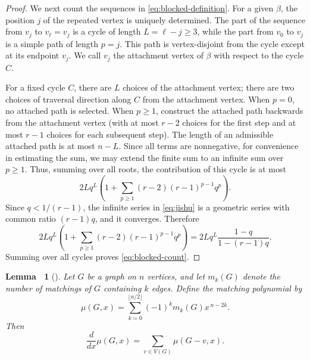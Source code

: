 \documentclass[11pt, a4paper]{article}
\theoremstyle{plain}
\newtheorem{lemma}{Lemma\ }[section]
\begin{document}
\begin{proof}
We next count the sequences in \eqref{eq:blocked-definition}.
For a given $\beta$, the position $j$ of the repeated vertex is uniquely determined.
The part of the sequence from $v_j$ to $v_\ell=v_j$ is a cycle of length $L=\ell-j\geq3$,
while the part from $v_0$ to $v_j$ is a simple path of length $p=j$.
This path is vertex-disjoint from the cycle except at its endpoint $v_j$.
We call $v_j$ the attachment vertex of $\beta$ with respect to the cycle $C$.

For a fixed cycle $C$, there are $L$ choices of the attachment vertex;
there are two choices of traversal direction along $C$ from the attachment vertex.
When $p=0$, no attached path is selected.
When $p\geq1$, construct the attached path backwards from the attachment vertex (with at most $r-2$ choices for the first step
and at most $r-1$ choices for each subsequent step).
The length of an admissible attached path is at most $n-L$. Since all terms are nonnegative, for convenience in estimating the sum,
we may extend the finite sum to an infinite sum over $p\ge1$.
Thus, summing over all roots, the contribution of this cycle is at most
\begin{equation}\label{eq:jishu}
 2Lq^L\left(1+\sum_{p\geq1}(r-2)(r-1)^{p-1}q^p\right).
\end{equation}
Since $q<1/(r-1)$, the infinite series in \eqref{eq:jishu} is
a geometric series with common ratio $(r-1)q$, and it converges. Therefore
\[
 2Lq^L\left(1+\sum_{p\geq1}(r-2)(r-1)^{p-1}q^p\right)
 =2Lq^L\frac{1-q}{1-(r-1)q}.
\]
Summing over all cycles proves \eqref{eq:blocked-count}.
\end{proof}

\begin{lemma}[\cite{va3}]\label{lemma:30}
Let $G$ be a graph on $n$ vertices,
and let $m_k(G)$ denote the number of matchings of $G$ containing $k$ edges.
Define the matching polynomial by
\[
\mu(G,x)
=
\sum_{k=0}^{\lfloor n/2\rfloor}
(-1)^k m_k(G)x^{\, n-2k}.
\]
Then
\[
\frac{d}{dx}\mu(G,x)
=
\sum_{v\in V(G)}\mu(G-v,x).
\]
\end{lemma}
\end{document}
